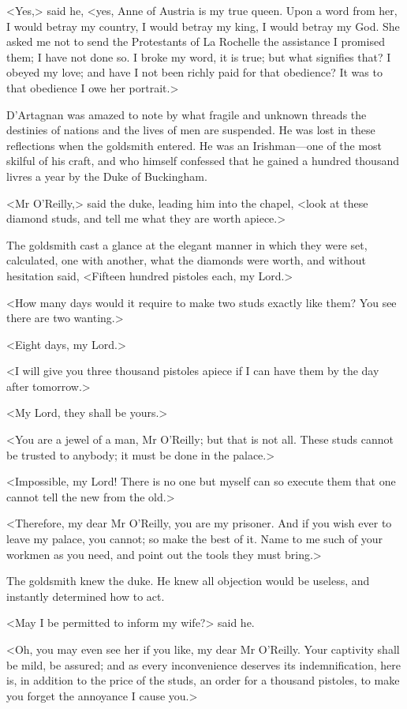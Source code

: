 <Yes,> said he, <yes, Anne of Austria is my true queen. Upon a word from her, I would betray my country, I would betray my king, I would betray my God. She asked me not to send the Protestants of La Rochelle the assistance I promised them; I have not done so. I broke my word, it is true; but what signifies that? I obeyed my love; and have I not been richly paid for that obedience? It was to that obedience I owe her portrait.> 

D'Artagnan was amazed to note by what fragile and unknown threads the destinies of nations and the lives of men are suspended. He was lost in these reflections when the goldsmith entered. He was an Irishman—one of the most skilful of his craft, and who himself confessed that he gained a hundred thousand livres a year by the Duke of Buckingham. 

<Mr O'Reilly,> said the duke, leading him into the chapel, <look at these diamond studs, and tell me what they are worth apiece.> 

The goldsmith cast a glance at the elegant manner in which they were set, calculated, one with another, what the diamonds were worth, and without hesitation said, <Fifteen hundred pistoles each, my Lord.> 

<How many days would it require to make two studs exactly like them? You see there are two wanting.> 

<Eight days, my Lord.> 

<I will give you three thousand pistoles apiece if I can have them by the day after tomorrow.> 

<My Lord, they shall be yours.> 

<You are a jewel of a man, Mr O'Reilly; but that is not all. These studs cannot be trusted to anybody; it must be done in the palace.> 

<Impossible, my Lord! There is no one but myself can so execute them that one cannot tell the new from the old.> 

<Therefore, my dear Mr O'Reilly, you are my prisoner. And if you wish ever to leave my palace, you cannot; so make the best of it. Name to me such of your workmen as you need, and point out the tools they must bring.> 

The goldsmith knew the duke. He knew all objection would be useless, and instantly determined how to act. 

<May I be permitted to inform my wife?> said he. 

<Oh, you may even see her if you like, my dear Mr O'Reilly. Your captivity shall be mild, be assured; and as every inconvenience deserves its indemnification, here is, in addition to the price of the studs, an order for a thousand pistoles, to make you forget the annoyance I cause you.> 

